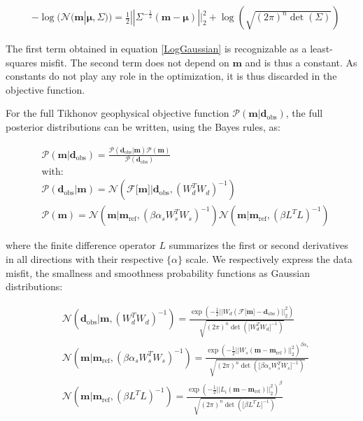\documentclass[extra]{gji} %
\begin{document}
\begin{align}
&-\log(\mathcal{N}(\mathbf{m}|\mathbf{\mu}, \Sigma)) = \frac{1}{2}||\Sigma^{-\frac{1}{2}}(\mathbf{m}-\mathbf{\mu})||_2^2 + \log({\sqrt{(2\pi)^n\det(\Sigma)}}) \label{LogGaussian}
\end{align}

The first term obtained in equation \ref{LogGaussian} is recognizable as a least-squares misfit. The second term does not depend on $\mathbf{m}$ and is thus a constant. As constants do not play any role in the optimization, it is thus discarded in the objective function.

For the full Tikhonov geophysical objective function $\mathcal{P}(\mathbf{m}|\mathbf{d}_{\text{obs}})$, the full posterior distributions can be written, using the Bayes rules, as:

\begin{align}
&\mathcal{P}(\mathbf{m}|\mathbf{d}_{\text{obs}}) = \frac{\mathcal{P}(\mathbf{d}_{\text{obs}}|\mathbf{m})\mathcal{P}(\mathbf{m})}{\mathcal{P}(\mathbf{d}_{\text{obs}})} \label{appendix:Bayes}\\
&\text{with: }\nonumber\\
&\mathcal{P}(\mathbf{d}_{\text{obs}}|\mathbf{m}) = \mathcal{N}(\mathcal{F}\lbrack\mathbf{m}\rbrack|\mathbf{d}_{\text{obs}}, (W_d^TW_d)^{-1}) \\
&\mathcal{P}(\mathbf{m}) = \mathcal{N}(\mathbf{m}|\mathbf{m}_{{\text{ref}}}, (\beta\alpha_sW_s^TW_s)^{-1})\mathcal{N}(\mathbf{m}|\mathbf{m}_{{\text{ref}}},(\beta L^TL)^{-1})
\end{align}

where the finite difference operator $L$ summarizes the first or second derivatives in all directions with their respective $\{\alpha\}$ scale. We respectively express the data misfit, the smallness and smoothness probability functions as Gaussian distributions:

\begin{align}
&\mathcal{N}(\mathbf{d}_{\text{obs}}|\mathbf{m}, (W_d^TW_d)^{-1}) = {\frac{\exp(-\frac{1}{2}||W_d(\mathcal{F}\lbrack\mathbf{m}\rbrack-\mathbf{d}_{\text{obs}})||_2^2)}{\sqrt{(2\pi)^n\det(\lbrack W_d^TW_d\rbrack^{-1})}}} \label{DataMisfitGaussian}\\
&\mathcal{N}(\mathbf{m}|\mathbf{m}_{{\text{ref}}}, (\beta\alpha_sW_s^TW_s)^{-1}) = {\frac{\exp(-\frac{1}{2}||W_s(\mathbf{m}-\mathbf{m}_{{\text{ref}}})||_2^2)^{\beta\alpha_s}}{\sqrt{(2\pi)^n\det(\lbrack \beta\alpha_sW_s^TW_s\rbrack^{-1})}}} \label{SmallnessGaussian}\\
&\mathcal{N}(\mathbf{m}|\mathbf{m}_{{\text{ref}}}, (\beta L^TL)^{-1}) = {\frac{\exp(-\frac{1}{2}||L_i(\mathbf{m}-\mathbf{m}_{{\text{ref}}})||_2^2)^{\beta}}{\sqrt{(2\pi)^n\det(\lbrack \beta L^TL\rbrack^{-1})}}} \label{SmoothnessGaussian}
\end{align}
\end{document}
